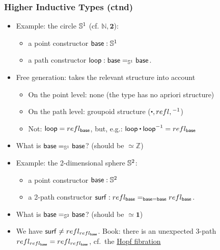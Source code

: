\documentclass[handout]{beamer}
\newcommand{\Nat}{\mathbb{N}}
\newcommand{\Int}{\mathbb{Z}}
\newcommand{\bfone}{\mathbf{1}}
\newcommand{\bftwo}{\mathbf{2}}
\newcommand{\ct}{%
  \mathchoice{\mathbin{\raisebox{0.5ex}{$\displaystyle\centerdot$}}}%
             {\mathbin{\raisebox{0.5ex}{$\centerdot$}}}%
             {\mathbin{\raisebox{0.25ex}{$\scriptstyle\,\centerdot\,$}}}%
             {\mathbin{\raisebox{0.1ex}{$\scriptscriptstyle\,\centerdot\,$}}}
}
\begin{document}
\frame
  {
    \frametitle{Higher Inductive Types (ctnd)}

    \begin{itemize}[<+->]
    \item Example: the circle $\mathbb{S}^1$ (cf. $\Nat,\bftwo$):
\begin{itemize}
\item a point constructor $\mathsf{base} :\mathbb{S}^1$
\item a path constructor $\mathsf{loop} : {\mathsf{base} =_{\mathbb{S}^1} \mathsf{base}}$.
\end{itemize}
      \item Free generation: takes the relevant structure into account
 \begin{itemize}
\item On the point level: none (the type has no apriori structure)
\item On the path level: groupoid structure ($\ct, refl, {}^{-1}$)
\item Not: $\mathsf{loop} = refl_ {\mathsf{base}}$, but, e.g.: $\lloop\ct\lloop^{-1} = refl_ {\base}$
\end{itemize}
    \item What is  $\mathsf{base} =_{\mathbb{S}^1} \mathsf{base}$? (should be $\simeq \Int$)
    \item Example: the 2-dimensional sphere $\mathbb{S}^2$:
\begin{itemize}
\item a point constructor $\mathsf{base} :\mathbb{S}^2$
\item a 2-path constructor $\mathsf{surf} : refl_{\mathsf{base}} =_{\mathsf{base}=\mathsf{base}} refl_{\mathsf{base}}$.
\end{itemize}
    \item What is  $\mathsf{base} =_{\mathbb{S}^2} \mathsf{base}$? (should be $\simeq \bfone$)
    \item We have $\mathsf{surf}\neq refl_{refl_{\mathsf{base}}}$. 
             Book:  there is an unexpected 3-path $refl_{refl_{\mathsf{base}}} = refl_{refl_{\mathsf{base}}}$, cf.\ the 
             \href{http://en.wikipedia.org/wiki/Hopf_fibration}{\color{red}Hopf fibration}
    \end{itemize}
  }
  
\end{document}
